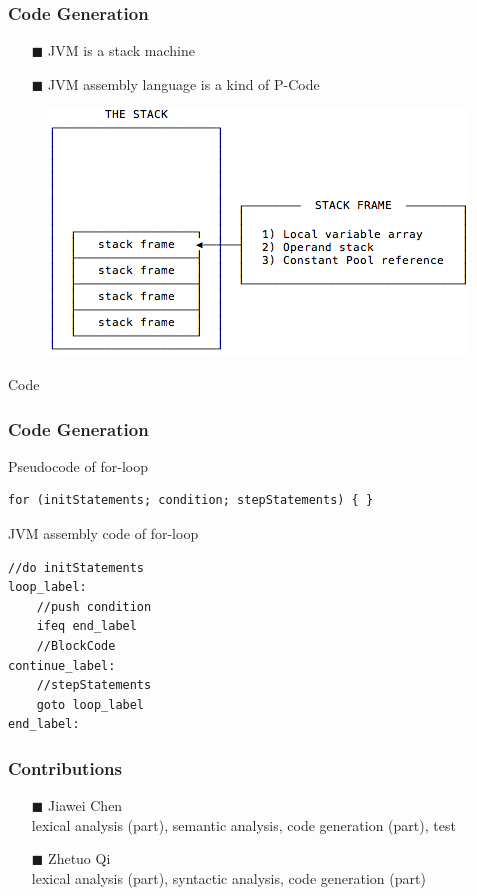 \documentclass{beamer}
\begin{document}
\begin{frame}
    \frametitle{Code Generation}
    \begin{itemize}
        \item[$\blacksquare$] JVM is a stack machine
        \item[$\blacksquare$] JVM assembly language is a kind of P-Code
    \end{itemize}
    \begin{figure}[h]
        \centering
        \includegraphics[scale=0.5]{assets/JVM-stack.png}
    \end{figure}
\end{frame}

\begin{frame}[fragile]{Code}
    \frametitle{Code Generation}
    \begin{block}{Pseudocode of for-loop}
        \begin{lstlisting}[firstnumber=1, label=glabels, xleftmargin=10pt] 
for (initStatements; condition; stepStatements) { }
        \end{lstlisting}
    \end{block}
    
    \begin{block}{JVM assembly code of for-loop}
        \begin{lstlisting}[firstnumber=1, label=glabels, xleftmargin=10pt] 
   //do initStatements
loop_label:
    //push condition
    ifeq end_label
    //BlockCode
continue_label:    
    //stepStatements
    goto loop_label
end_label:
        \end{lstlisting}
    \end{block}
\end{frame}

\begin{frame}
    \frametitle{Contributions}
    \begin{itemize}
        \item[$\blacksquare$] Jiawei Chen \\
        lexical analysis (part), semantic analysis, code generation (part), test
        \item[$\blacksquare$] Zhetuo Qi \\
        lexical analysis (part), syntactic analysis, code generation (part)
    \end{itemize}
\end{frame}
\end{document}
